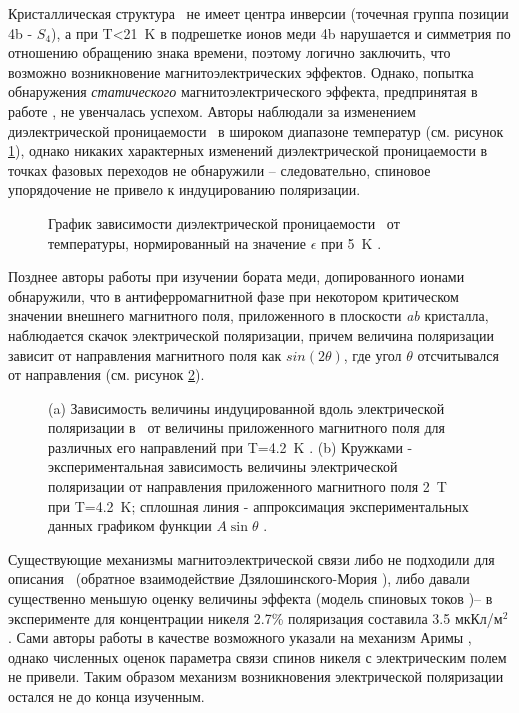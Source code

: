 Кристаллическая структура \cbo\ не имеет центра инверсии (точечная группа позиции 4b - \(S_4\)), а при T<\SI{21}{\kelvin} в подрешетке ионов меди 4b нарушается и симметрия по отношению обращению знака времени, поэтому логично заключить, что возможно возникновение магнитоэлектрических эффектов. Однако, попытка обнаружения \emph{статического} магнитоэлектрического эффекта, предпринятая в работе \cite{Nenert2007}, не увенчалась успехом. Авторы наблюдали за изменением диэлектрической проницаемости \cbo\ в широком диапазоне температур (см. рисунок \cref{fig:nenert}), однако никаких характерных изменений диэлектрической проницаемости в точках фазовых переходов не обнаружили -- следовательно, спиновое упорядочение не привело к индуцированию поляризации.

\begin{figure}[ht]
	\label{fig:nenert}
	\caption{График зависимости диэлектрической проницаемости \cbo\ от температуры, нормированный на значение $\epsilon$ при \SI{5}{\kelvin} \cite{Nenert2007}.}
\end{figure}

Позднее авторы работы \cite{Khan2013} при изучении бората меди, допированного ионами \niIon\, обнаружили, что в антиферромагнитной фазе при некотором критическом значении внешнего магнитного поля, приложенного в плоскости \textit{ab} кристалла, наблюдается скачок электрической поляризации, причем величина поляризации зависит от направления магнитного поля как \(sin\left(2\theta\right)\), где угол \(\theta\) отсчитывался от направления  (см. рисунок \cref{fig:khan}).

\begin{figure}[ht]
	\label{fig:khan}
	\caption{(a) Зависимость величины индуцированной вдоль  электрической поляризации в \ncbo\ от величины приложенного магнитного поля для различных его направлений при T=\SI{4.2}{\kelvin} \cite{Nenert2007}. (b) Кружками - экспериментальная зависимость величины электрической поляризации от направления приложенного магнитного поля \SI{2}{\tesla} при T=\SI{4.2}{\kelvin}; сплошная линия - аппроксимация экспериментальных данных графиком функции $A\sin\theta$ \cite{Nenert2007}.}
\end{figure} 

Существующие механизмы магнитоэлектрической связи либо не подходили для описания \cbo\ (обратное взаимодействие Дзялошинского-Мория \cite{Sergienko2006}), либо давали существенно меньшую оценку величины эффекта (модель спиновых токов \cite{Katsura2005})– в эксперименте для концентрации никеля 2.7\% поляризация составила 3.5 мкКл/м\(^2\). Сами авторы работы \cite{Khan2013} в качестве возможного указали на механизм Аримы \cite{Arima2007}, однако численных оценок параметра связи спинов никеля с электрическим полем не привели. Таким образом механизм возникновения электрической поляризации остался не до конца изученным.

